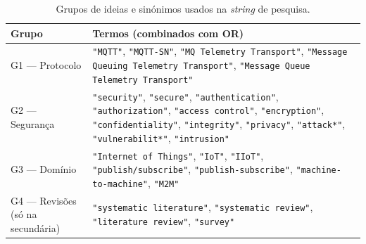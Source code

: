 \begin{table}[ht]
  \centering
  \caption{Grupos de ideias e sinónimos usados na \emph{string} de pesquisa.}
  \label{tab:grupos}
  \small
  \begin{tabularx}{\textwidth}{@{}L{2.8cm}Y@{}}
    \toprule
    \textbf{Grupo} & \textbf{Termos (combinados com OR)} \\
    \midrule
    G1 --- Protocolo   & \texttt{"MQTT"}, \texttt{"MQTT-SN"}, \texttt{"MQ Telemetry Transport"},
                         \texttt{"Message Queuing Telemetry Transport"},
                         \texttt{"Message Queue Telemetry Transport"} \\
    G2 --- Segurança   & \texttt{"security"}, \texttt{"secure"}, \texttt{"authentication"},
                         \texttt{"authorization"}, \texttt{"access control"},
                         \texttt{"encryption"}, \texttt{"confidentiality"},
                         \texttt{"integrity"}, \texttt{"privacy"}, \texttt{"attack*"},
                         \texttt{"vulnerabilit*"}, \texttt{"intrusion"} \\
    G3 --- Domínio     & \texttt{"Internet of Things"}, \texttt{"IoT"}, \texttt{"IIoT"},
                         \texttt{"publish/subscribe"}, \texttt{"publish-subscribe"},
                         \texttt{"machine-to-machine"}, \texttt{"M2M"} \\
    G4 --- Revisões \newline(só na secundária) & \texttt{"systematic literature"},
                         \texttt{"systematic review"}, \texttt{"literature review"},
                         \texttt{"survey"} \\
    \bottomrule
  \end{tabularx}
\end{table}

